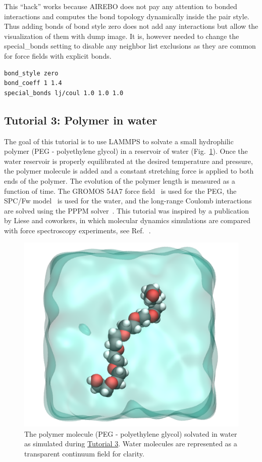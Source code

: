 \documentclass[9pt,tutorial]{livecoms}
\newcommand{\lmpcmd}[1]{\colorbox{listing}{\textcolor{command}{\small{#1}}}} %
\begin{document}
This ``hack'' works because AIREBO does not pay any attention to bonded
interactions and computes the bond topology dynamically inside the pair
style.  Thus adding bonds of bond style \lmpcmd{zero} does not add any
interactions but allow the visualization of them with \lmpcmd{dump
  image}.  It is, however needed to change the \lmpcmd{special\_bonds}
setting to disable any neighbor list exclusions as they are common for
force fields with explicit bonds.
\begin{lstlisting}
bond_style zero
bond_coeff 1 1.4
special_bonds lj/coul 1.0 1.0 1.0
\end{lstlisting}

\subsection{Tutorial 3: Polymer in water}
\label{all-atom-label}

The goal of this tutorial is to use LAMMPS to solvate a small
hydrophilic polymer (PEG - polyethylene glycol) in a reservoir of water
(Fig.~\ref{fig:PEG}).  Once the water reservoir is properly equilibrated
at the desired temperature and pressure, the polymer molecule is added
and a constant stretching force is applied to both ends of the polymer.
The evolution of the polymer length is measured as a function of time.
The {GROMOS} 54A7 force field~\cite{schmid2011definition} is used for the
PEG, the SPC/Fw model~\cite{wu2006flexible} is used for the water, and
the long-range Coulomb interactions are solved using the PPPM
solver~\cite{luty1996calculating}.  This tutorial was inspired by a
publication by Liese and coworkers, in which molecular dynamics
simulations are compared with force spectroscopy experiments, see
Ref.\,~.

\begin{figure}
\centering
\includegraphics[width=0.55\linewidth]{PEG}
\caption{The polymer molecule (PEG - polyethylene glycol) solvated in water as
simulated during \hyperref[all-atom-label]{Tutorial 3}.  Water molecules are
represented as a transparent continuum field for clarity.}
\label{fig:PEG}
\end{figure}
\end{document}

